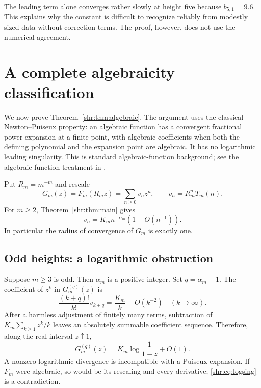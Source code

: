 \documentclass[11pt,letterpaper]{article}
\numberwithin{equation}{section}
\theoremstyle{definition}
\newcommand{\1}{\mathbf 1}
\begin{document}
The leading term alone converges rather slowly at height five because
$b_{5,1}=9.6$. This explains why the constant is difficult to recognize
reliably from modestly sized data without correction terms. The proof,
however, does not use the numerical agreement.

\section{A complete algebraicity classification}\label{shr:sec:algebraicity}

We now prove Theorem~\ref{shr:thm:algebraic}. The argument uses the classical
Newton--Puiseux property: an algebraic function has a convergent fractional
power expansion at a finite point, with algebraic coefficients when both
the defining polynomial and the expansion point are algebraic. It has no
logarithmic leading singularity. This is standard algebraic-function
background; see the algebraic-function treatment in \cite{FS}.

Put $R_m=m^{-m}$ and rescale
\[
 G_m(z)=F_m(R_mz)=\sum_{n\ge0}v_nz^n,\qquad
 v_n=R_m^nT_m(n).
\]
For $m\ge2$, Theorem~\ref{shr:thm:main} gives
\begin{equation}
 v_n=K_m n^{-\alpha_m}(1+O(n^{-1})).
 \label{shr:eq:vn}
\end{equation}
In particular the radius of convergence of $G_m$ is exactly one.

\subsection{Odd heights: a logarithmic obstruction}
Suppose $m\ge3$ is odd. Then $\alpha_m$ is a positive integer. Set
$q=\alpha_m-1$. The coefficient of $z^k$ in $G_m^{(q)}(z)$ is
\[
 \frac{(k+q)!}{k!}v_{k+q}=\frac{K_m}{k}+O(k^{-2})
 \quad(k\longrightarrow\infty).
\]
After a harmless adjustment of finitely many terms, subtraction of
$K_m\sum_{k\ge1}z^k/k$ leaves an absolutely summable coefficient sequence.
Therefore, along the real interval $z\uparrow1$,
\begin{equation}
 G_m^{(q)}(z)=K_m\log\frac1{1-z}+O(1).
 \label{shr:eq:logsing}
\end{equation}
A nonzero logarithmic divergence is incompatible with a Puiseux expansion.
If $F_m$ were algebraic, so would be its rescaling and every derivative;
\eqref{shr:eq:logsing} is a contradiction.
\end{document}
